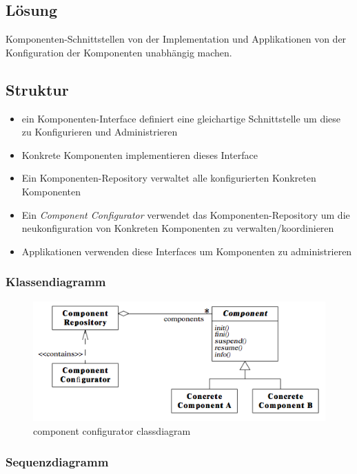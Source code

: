 \subsection{Lösung}

Komponenten-Schnittstellen von der Implementation und Applikationen von der Konfiguration der Komponenten unabhängig machen.

\subsection{Struktur}

\begin{itemize}
	\item ein Komponenten-Interface definiert eine gleichartige Schnittstelle um diese zu Konfigurieren und Administrieren
	\item Konkrete Komponenten implementieren dieses Interface
	\item Ein Komponenten-Repository verwaltet alle konfigurierten Konkreten Komponenten
	\item Ein \emph{Component Configurator} verwendet das Komponenten-Repository um die neukonfiguration von Konkreten Komponenten zu verwalten/koordinieren
	\item Applikationen verwenden diese Interfaces um Komponenten zu administrieren
\end{itemize}

\subsubsection*{Klassendiagramm}


\begin{figure}[H]
	\centering
	\includegraphics[width=\textwidth]{content/posa2/component-configurator/images/component-configurator-classdiagram.png}
	\caption{component configurator classdiagram}
\end{figure}


\subsubsection*{Sequenzdiagramm}


